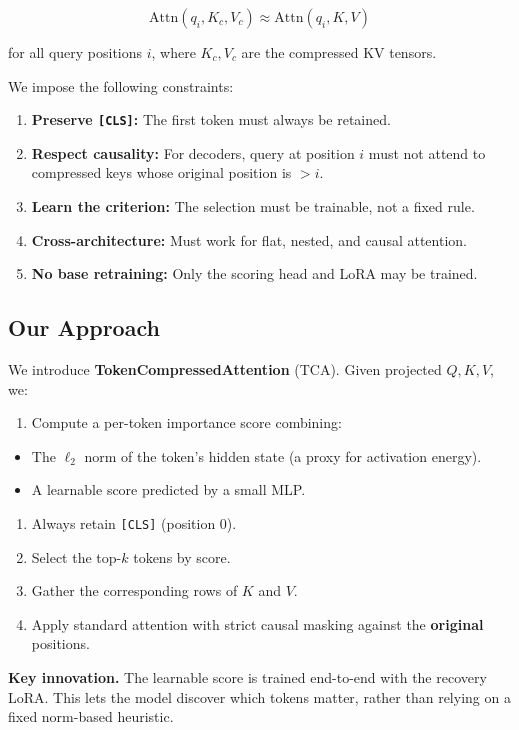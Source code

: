 \[
\text{Attn}(q_i, K_c, V_c) \approx \text{Attn}(q_i, K, V)
\tag{1.1}
\]

for all query positions $i$, where $K_c, V_c$ are the compressed KV tensors.

We impose the following constraints:

\begin{enumerate}
\item \textbf{Preserve \texttt{[CLS]}:} The first token must always be retained.
\item \textbf{Respect causality:} For decoders, query at position $i$ must not attend
  to compressed keys whose original position is $> i$.
\item \textbf{Learn the criterion:} The selection must be trainable, not a fixed rule.
\item \textbf{Cross-architecture:} Must work for flat, nested, and causal attention.
\item \textbf{No base retraining:} Only the scoring head and LoRA may be trained.

\end{enumerate}
\subsection{Our Approach}

We introduce \textbf{TokenCompressedAttention} (TCA). Given projected $Q, K, V$, we:

\begin{enumerate}
\item Compute a per-token importance score combining:
\end{enumerate}
\begin{itemize}
\item The $\ell_2$ norm of the token's hidden state (a proxy for activation energy).
\item A learnable score predicted by a small MLP.
\end{itemize}
\begin{enumerate}
\item Always retain \texttt{[CLS]} (position 0).
\item Select the top-$k$ tokens by score.
\item Gather the corresponding rows of $K$ and $V$.
\item Apply standard attention with strict causal masking against the \textbf{original} positions.

\end{enumerate}
\textbf{Key innovation.} The learnable score is trained end-to-end with the recovery 
LoRA. This lets the model discover which tokens matter, rather than relying 
on a fixed norm-based heuristic.

